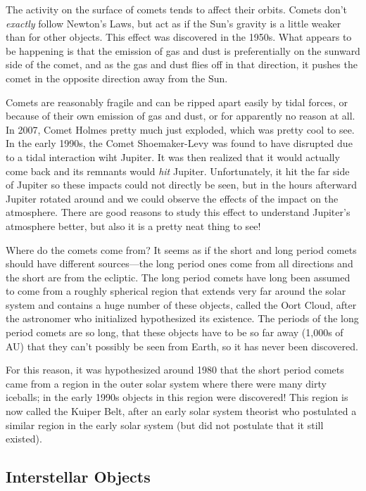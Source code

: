 \documentclass[12pt, preprint]{aastex}
\begin{document}
The activity on the surface of comets tends to affect their
orbits. Comets don't {\it exactly} follow Newton's Laws, but act as if
the Sun's gravity is a little weaker than for other objects. This
effect was discovered in the 1950s. What appears to be happening is
that the emission of gas and dust is preferentially on the sunward
side of the comet, and as the gas and dust flies off in that
direction, it pushes the comet in the opposite direction away from
the Sun.

Comets are reasonably fragile and can be ripped apart easily by tidal
forces, or because of their own emission of gas and dust, or for
apparently no reason at all. In 2007, Comet Holmes pretty much just
exploded, which was pretty cool to see. In the early 1990s, the Comet
Shoemaker-Levy was found to have disrupted due to a tidal interaction
wiht Jupiter. It was then realized that it would actually come back
and its remnants would {\it hit} Jupiter. Unfortunately, it hit the
far side of Jupiter so these impacts could not directly be seen, but
in the hours afterward Jupiter rotated around and we could observe the
effects of the impact on the atmosphere. There are good reasons to
study this effect to understand Jupiter's atmosphere better, but also
it is a pretty neat thing to see!

Where do the comets come from? It seems as if the short and long
period comets should have different sources---the long period ones
come from all directions and the short are from the ecliptic. The long
period comets have long been assumed to come from a roughly spherical
region that extends very far around the solar system and contains a
huge number of these objects, called the Oort Cloud, after the
astronomer who initialized hypothesized its existence. The periods of
the long period comets are so long, that these objects have to be so
far away (1,000s of AU) that they can't possibly be seen from Earth,
so it has never been discovered.

For this reason, it was hypothesized around 1980 that the short period
comets came from a region in the outer solar system where there were
many dirty iceballs; in the early 1990s objects in this region were
discovered! This region is now called the Kuiper Belt, after an early
solar system theorist who postulated a similar region in the early
solar system (but did not postulate that it still existed).

\subsection{Interstellar Objects}
\end{document}
